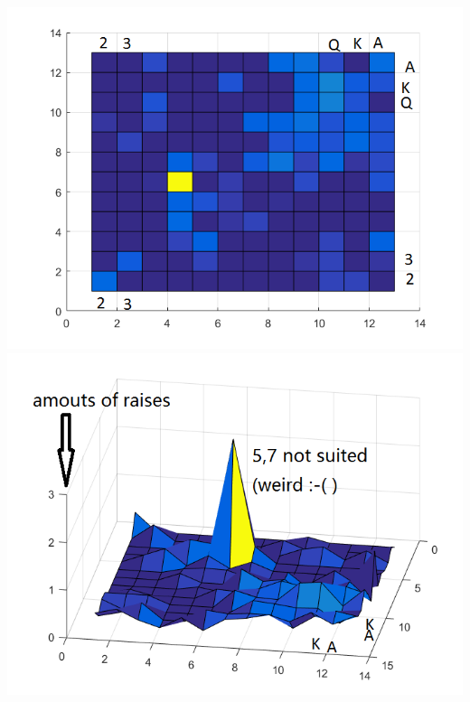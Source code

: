 \documentclass[12pt]{article}
\begin{document}
\includegraphics[scale=.5]{A0mR}
\includegraphics[scale=.5]{A0mR1}
\end{document}
